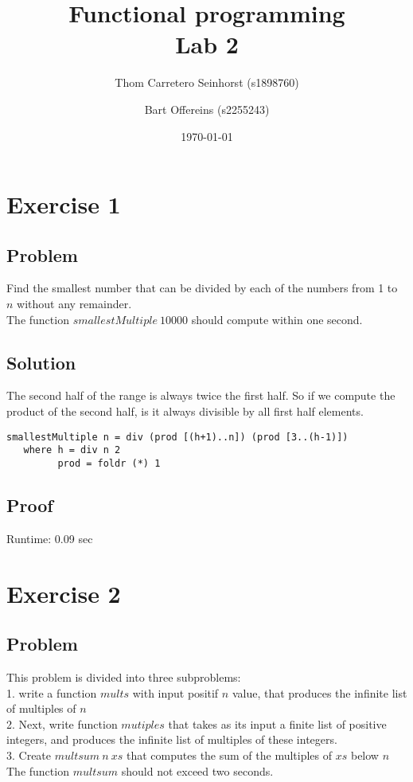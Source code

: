 \documentclass[a4paper,11pt]{article}
\author{Thom Carretero Seinhorst (s1898760) \and Bart Offereins (s2255243)}
\date{\today}
\title{Functional programming \\Lab 2}
\begin{document}
  \maketitle
  
\section{Exercise 1}
\subsection{Problem}
Find the smallest number that can be divided by each of the numbers from 1 to $n$ without any remainder.\\
The function $smallestMultiple\: 10000$ should compute within one second.

\subsection{Solution}
The second half of the range is always twice the first half. So if we compute the product of the second half, is it always divisible by all first half elements.

\begin{lstlisting}
smallestMultiple n = div (prod [(h+1)..n]) (prod [3..(h-1)])
   where h = div n 2
         prod = foldr (*) 1
\end{lstlisting}
\subsection{Proof}

Runtime: 0.09 sec

\section{Exercise 2}
\subsection{Problem}
This problem is divided into three subproblems:\\
1. write a function $mults$ with input positif $n$ value, that produces the infinite list of multiples of $n$\\
2. Next, write function $mutiples$ that takes as its input a finite list of positive integers,
and produces the infinite list of multiples of these integers.\\
3. Create $multsum\: n\: xs$ that computes the sum of the multiples
of $xs$ below $n$\\
The function $multsum$ should not exceed two seconds.
\end{document}
